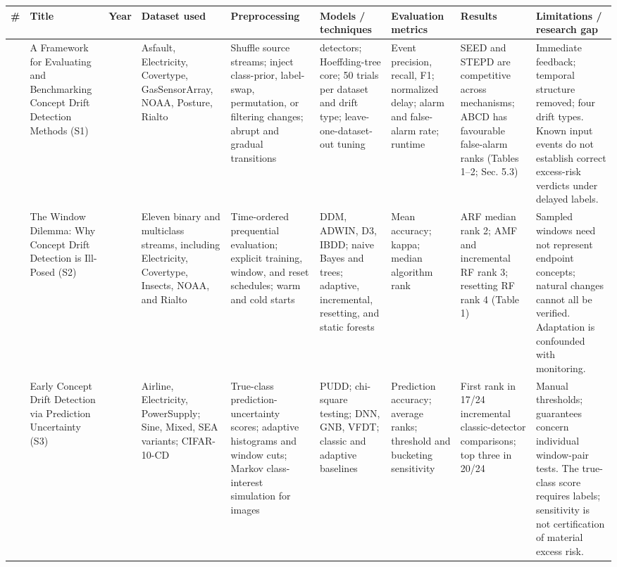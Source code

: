 \documentclass[
]{article}
\begin{document}
\begin{longtable}[]{@{}
  >{\raggedright\arraybackslash}p{}
  >{\raggedright\arraybackslash}p{}
  >{\raggedright\arraybackslash}p{}
  >{\raggedright\arraybackslash}p{}
  >{\raggedright\arraybackslash}p{}
  >{\raggedright\arraybackslash}p{}
  >{\raggedright\arraybackslash}p{}
  >{\raggedright\arraybackslash}p{}
  >{\raggedright\arraybackslash}p{}@{}}
\toprule
\# & Title & Year & Dataset used & Preprocessing & Models / techniques &
Evaluation metrics & Results & Limitations / research gap \\
\midrule
\endhead
1 & A Framework for Evaluating and Benchmarking Concept Drift Detection
Methods (S1) & 2026 & Asfault, Electricity, Covertype, GasSensorArray,
NOAA, Posture, Rialto & Shuffle source streams; inject class-prior,
label-swap, permutation, or filtering changes; abrupt and gradual
transitions & 14 detectors; Hoeffding-tree core; 50 trials per dataset
and drift type; leave-one-dataset-out tuning & Event precision, recall,
F1; normalized delay; alarm and false-alarm rate; runtime & SEED and
STEPD are competitive across mechanisms; ABCD has favourable false-alarm
ranks (Tables 1--2; Sec. 5.3) & Immediate feedback; temporal structure
removed; four drift types. Known input events do not establish correct
excess-risk verdicts under delayed labels. \\
2 & The Window Dilemma: Why Concept Drift Detection is Ill-Posed (S2) &
2026 & Eleven binary and multiclass streams, including Electricity,
Covertype, Insects, NOAA, and Rialto & Time-ordered prequential
evaluation; explicit training, window, and reset schedules; warm and
cold starts & DDM, ADWIN, D3, IBDD; naive Bayes and trees; adaptive,
incremental, resetting, and static forests & Mean accuracy; kappa;
median algorithm rank & ARF median rank 2; AMF and incremental RF rank
3; resetting RF rank 4 (Table 1) & Sampled windows need not represent
endpoint concepts; natural changes cannot all be verified. Adaptation is
confounded with monitoring. \\
3 & Early Concept Drift Detection via Prediction Uncertainty (S3) & 2025
& Airline, Electricity, PowerSupply; Sine, Mixed, SEA variants;
CIFAR-10-CD & True-class prediction-uncertainty scores; adaptive
histograms and window cuts; Markov class-interest simulation for images
& PUDD; chi-square testing; DNN, GNB, VFDT; classic and adaptive
baselines & Prediction accuracy; average ranks; threshold and bucketing
sensitivity & First rank in 17/24 incremental classic-detector
comparisons; top three in 20/24 & Manual thresholds; guarantees concern
individual window-pair tests. The true-class score requires labels;
sensitivity is not certification of material excess risk. \\
\bottomrule
\end{longtable}
\end{document}
